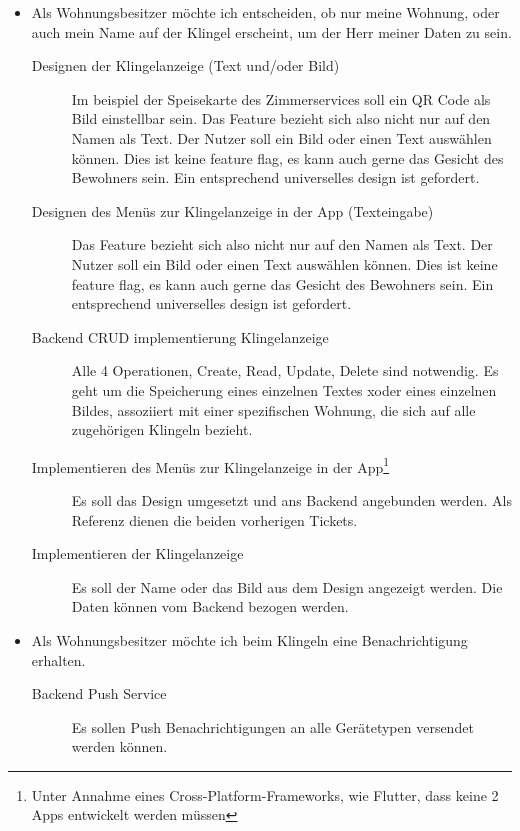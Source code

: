 \begin{itemize}
    \item Als Wohnungsbesitzer möchte ich entscheiden, ob nur meine Wohnung, oder auch mein Name auf der Klingel erscheint, um der Herr meiner Daten zu sein.
        \begin{description}
            \item[Designen der Klingelanzeige (Text und/oder Bild)] Im beispiel der Speisekarte des Zimmerservices soll ein QR Code als Bild einstellbar sein.
                Das Feature bezieht sich also nicht nur auf den Namen als Text.
                Der Nutzer soll ein Bild oder einen Text auswählen können.
                Dies ist keine feature flag, es kann auch gerne das Gesicht des Bewohners sein.
                Ein entsprechend universelles design ist gefordert.
            \item[Designen des Menüs zur Klingelanzeige in der App (Texteingabe)]
                Das Feature bezieht sich also nicht nur auf den Namen als Text.
                Der Nutzer soll ein Bild oder einen Text auswählen können.
                Dies ist keine feature flag, es kann auch gerne das Gesicht des Bewohners sein.
                Ein entsprechend universelles design ist gefordert.
            \item[Backend CRUD implementierung Klingelanzeige]
                Alle 4 Operationen, Create, Read, Update, Delete sind notwendig.
                Es geht um die Speicherung eines einzelnen Textes xoder eines einzelnen Bildes, assoziiert mit einer spezifischen Wohnung, die sich auf alle zugehörigen Klingeln bezieht.
            \item[Implementieren des Menüs zur Klingelanzeige in der App\footnote{Unter Annahme eines Cross-Platform-Frameworks, wie Flutter, dass keine 2 Apps entwickelt werden müssen}]
                Es soll das Design umgesetzt und ans Backend angebunden werden.
                Als Referenz dienen die beiden vorherigen Tickets.
            \item[Implementieren der Klingelanzeige]
                Es soll der Name oder das Bild aus dem Design angezeigt werden.
                Die Daten können vom Backend bezogen werden.
        \end{description}
    \item Als Wohnungsbesitzer möchte ich beim Klingeln eine Benachrichtigung erhalten.
        \begin{description}
            \item[Backend Push Service] Es sollen Push Benachrichtigungen an alle Gerätetypen versendet werden können.

\end{description}
\end{itemize}
